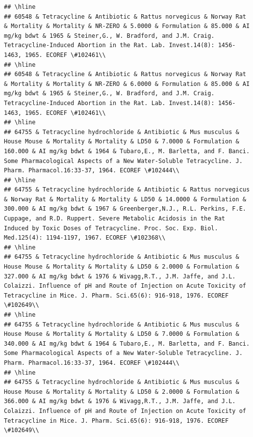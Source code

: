 \documentclass[12pt,]{article}
\begin{document}
\begin{verbatim}
## \hline
## 60548 & Tetracycline & Antibiotic & Rattus norvegicus & Norway Rat & Mortality & Mortality & NR-ZERO & 5.0000 & Formulation & 85.000 & AI mg/kg bdwt & 1965 & Steiner,G., W. Bradford, and J.M. Craig. Tetracycline-Induced Abortion in the Rat. Lab. Invest.14(8): 1456-1463, 1965. ECOREF \#102461\\
## \hline
## 60548 & Tetracycline & Antibiotic & Rattus norvegicus & Norway Rat & Mortality & Mortality & NR-ZERO & 6.0000 & Formulation & 85.000 & AI mg/kg bdwt & 1965 & Steiner,G., W. Bradford, and J.M. Craig. Tetracycline-Induced Abortion in the Rat. Lab. Invest.14(8): 1456-1463, 1965. ECOREF \#102461\\
## \hline
## 64755 & Tetracycline hydrochloride & Antibiotic & Mus musculus & House Mouse & Mortality & Mortality & LD50 & 7.0000 & Formulation & 160.000 & AI mg/kg bdwt & 1964 & Tubaro,E., M. Barletta, and F. Banci. Some Pharmacological Aspects of a New Water-Soluble Tetracycline. J. Pharm. Pharmacol.16:33-37, 1964. ECOREF \#102444\\
## \hline
## 64755 & Tetracycline hydrochloride & Antibiotic & Rattus norvegicus & Norway Rat & Mortality & Mortality & LD50 & 14.0000 & Formulation & 300.000 & AI mg/kg bdwt & 1967 & Greenberger,N.J., R.L. Perkins, F.E. Cuppage, and R.D. Ruppert. Severe Metabolic Acidosis in the Rat Induced by Toxic Doses of Tetracycline. Proc. Soc. Exp. Biol. Med.125(4): 1194-1197, 1967. ECOREF \#102368\\
## \hline
## 64755 & Tetracycline hydrochloride & Antibiotic & Mus musculus & House Mouse & Mortality & Mortality & LD50 & 2.0000 & Formulation & 327.000 & AI mg/kg bdwt & 1976 & Wivagg,R.T., J.M. Jaffe, and J.L. Colaizzi. Influence of pH and Route of Injection on Acute Toxicity of Tetracycline in Mice. J. Pharm. Sci.65(6): 916-918, 1976. ECOREF \#102649\\
## \hline
## 64755 & Tetracycline hydrochloride & Antibiotic & Mus musculus & House Mouse & Mortality & Mortality & LD50 & 7.0000 & Formulation & 340.000 & AI mg/kg bdwt & 1964 & Tubaro,E., M. Barletta, and F. Banci. Some Pharmacological Aspects of a New Water-Soluble Tetracycline. J. Pharm. Pharmacol.16:33-37, 1964. ECOREF \#102444\\
## \hline
## 64755 & Tetracycline hydrochloride & Antibiotic & Mus musculus & House Mouse & Mortality & Mortality & LD50 & 2.0000 & Formulation & 366.000 & AI mg/kg bdwt & 1976 & Wivagg,R.T., J.M. Jaffe, and J.L. Colaizzi. Influence of pH and Route of Injection on Acute Toxicity of Tetracycline in Mice. J. Pharm. Sci.65(6): 916-918, 1976. ECOREF \#102649\\

\end{verbatim}
\end{document}
